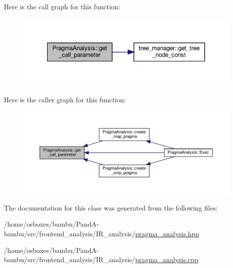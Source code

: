 Here is the call graph for this function\+:
\nopagebreak
\begin{figure}[H]
\begin{center}
\leavevmode
\includegraphics[width=340pt]{d1/d63/classPragmaAnalysis_a568d30b208cf8dc645246ac355b390bb_cgraph}
\end{center}
\end{figure}
Here is the caller graph for this function\+:
\nopagebreak
\begin{figure}[H]
\begin{center}
\leavevmode
\includegraphics[width=350pt]{d1/d63/classPragmaAnalysis_a568d30b208cf8dc645246ac355b390bb_icgraph}
\end{center}
\end{figure}


The documentation for this class was generated from the following files\+:\begin{DoxyCompactItemize}
\item 
/home/osboxes/bambu/\+Pand\+A-\/bambu/src/frontend\+\_\+analysis/\+I\+R\+\_\+analysis/\hyperlink{pragma__analysis_8hpp}{pragma\+\_\+analysis.\+hpp}\item 
/home/osboxes/bambu/\+Pand\+A-\/bambu/src/frontend\+\_\+analysis/\+I\+R\+\_\+analysis/\hyperlink{pragma__analysis_8cpp}{pragma\+\_\+analysis.\+cpp}\end{DoxyCompactItemize}
